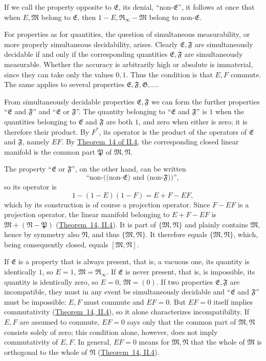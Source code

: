 \documentclass[fontsize=13pt,twoside,openany,headings=normal,parskip=false,bookmarkpackage=false,DIV=calc]{scrbook}
\begin{document}
If we call the property opposite to $\mathfrak E$, its denial, ``non-$\mathfrak E$'', it follows at once that when $E,\mathfrak M$ belong to $\mathfrak E$, then $1-E,\mathfrak R_\infty-\mathfrak M$ belong to non-$\mathfrak E$.

For properties as for quantities, the question of simultaneous measurability, or more properly simultaneous decidability, arises. Clearly $\mathfrak E,\mathfrak F$ are simultaneously decidable if and only if the corresponding quantities $\mathfrak E,\mathfrak F$ are simultaneously measurable. Whether the accuracy is arbitrarily high or absolute is immaterial, since they can take only the values $0,1$. Thus the condition is that $E,F$ commute. The same applies to several properties $\mathfrak E,\mathfrak F,\mathfrak G,\ldots$.

\hypertarget{origpage-133}{}%
From simultaneously decidable properties $\mathfrak E,\mathfrak F$ we can form the further properties ``$\mathfrak E$ and $\mathfrak F$'' and ``$\mathfrak E$ or $\mathfrak F$''. The quantity belonging to ``$\mathfrak E$ and $\mathfrak F$'' is $1$ when the quantities belonging to $\mathfrak E$ and $\mathfrak F$ are both $1$, and zero when either is zero; it is therefore their product. By \hyperref[post:III.5.Fstar]{$F^*$}, its operator is the product of the operators of $\mathfrak E$ and $\mathfrak F$, namely $EF$. By \hyperref[thm:II.14]{Theorem~14 of II.4}, the corresponding closed linear manifold is the common part $\mathfrak P$ of $\mathfrak M,\mathfrak N$.

The property ``$\mathfrak E$ or $\mathfrak F$'', on the other hand, can be written
\[
\text{``non-((non-}\mathfrak E\text{) and (non-}\mathfrak F\text{))''},
\]
so its operator is
\[
1-(1-E)(1-F)=E+F-EF,
\]
which by its construction is of course a projection operator. Since $F-EF$ is a projection operator, the linear manifold belonging to $E+F-EF$ is $\mathfrak M+(\mathfrak N-\mathfrak P)$ (\hyperref[thm:II.14]{Theorem~14, II.4}). It is part of $\{\mathfrak M,\mathfrak N\}$ and plainly contains $\mathfrak M$, hence by symmetry also $\mathfrak N$, and thus $\{\mathfrak M,\mathfrak N\}$. It therefore equals $\{\mathfrak M,\mathfrak N\}$, which, being consequently closed, equals $[\mathfrak M,\mathfrak N]$.

If $\mathfrak E$ is a property that is always present, that is, a vacuous one, its quantity is identically $1$, so $E=1$, $\mathfrak M=\mathfrak R_\infty$. If $\mathfrak E$ is never present, that is, is impossible, its quantity is identically zero, so $E=0$, $\mathfrak M=(0)$. If two properties $\mathfrak E,\mathfrak F$ are incompatible, they must in any event be simultaneously decidable and ``$\mathfrak E$ and $\mathfrak F$'' must be impossible: $E,F$ must commute and $EF=0$. But $EF=0$ itself implies commutativity (\hyperref[thm:II.14]{Theorem~14, II.4}), so it alone characterizes incompatibility. If $E,F$ are assumed to commute, $EF=0$ says only that the common part of $\mathfrak M,\mathfrak N$ consists solely of zero; this condition alone, however, does not imply commutativity of $E,F$. In general, $EF=0$ means for $\mathfrak M,\mathfrak N$ that the whole of $\mathfrak M$ is orthogonal to the whole of $\mathfrak N$ (\hyperref[thm:II.14]{Theorem~14, II.4}).
\end{document}
